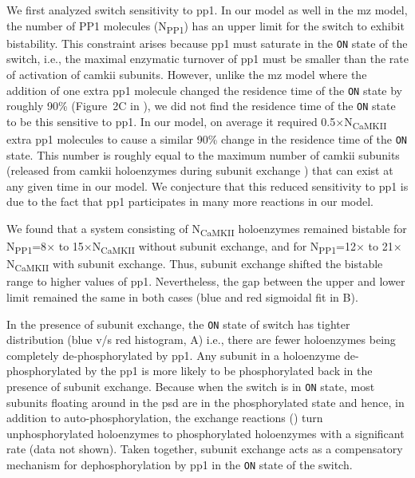 \documentclass[9pt,lineno,doublespacing]{elife}
\newcommand\SUB[2]{#1\textsubscript{#2}}
\begin{document}
We first analyzed switch sensitivity to \gls{pp1}. In our model as well in the
\gls{mz} model, the number of PP1 molecules (\SUB{N}{PP1}) has an upper limit
for the switch to exhibit bistability. This constraint arises because \gls{pp1}
must saturate in the \texttt{ON} state of the switch, i.e., the maximal
enzymatic turnover of \gls{pp1} must be smaller than the rate of activation of
\gls{camkii} subunits. However, unlike the \gls{mz} model where the addition of
one extra \gls{pp1} molecule changed the residence time of the \texttt{ON} state by
roughly 90\% (Figure~2C in \citep{miller_stability_2005}), we did not find the
residence time of the \texttt{ON} state to be this sensitive to \gls{pp1}. In our
model, on average it required 0.5$\times$\SUB{N}{CaMKII} extra \gls{pp1}
molecules to cause a similar 90\% change in the residence time of the \texttt{ON}
state.  This number is roughly equal to the maximum number of \gls{camkii}
subunits (released from \gls{camkii} holoenzymes during subunit exchange
) that can exist at any given time in our model. We conjecture
that this reduced sensitivity to \gls{pp1} is due to the fact that \gls{pp1}
participates in many more reactions in our model. 

We found that a system consisting of \SUB{N}{CaMKII} holoenzymes remained
bistable for \SUB{N}{PP1}=8$\times$ to 15$\times$\SUB{N}{CaMKII} without subunit
exchange, and for \SUB{N}{PP1}=12$\times$ to 21$\times$\SUB{N}{CaMKII} with
subunit exchange. Thus, subunit exchange shifted the bistable range to higher
values of \gls{pp1}. Nevertheless, the gap between the upper and lower limit remained
the same in both cases (blue and red sigmoidal fit in B).

In the presence of subunit exchange, the \texttt{ON} state of switch has tighter
distribution (blue v/s red histogram, A) i.e., there are
fewer holoenzymes being completely de-phosphorylated by \gls{pp1}. Any subunit
in a holoenzyme de-phosphorylated by the \gls{pp1} is more likely to be
phosphorylated back in the presence of subunit exchange. Because when the switch
is in \texttt{ON} state, most subunits floating around in the \gls{psd} are in
the phosphorylated state and hence, in addition to auto-phosphorylation, the
exchange reactions () turn unphosphorylated holoenzymes to
phosphorylated holoenzymes with a significant rate (data not shown). Taken
together, subunit exchange acts as a compensatory mechanism for
dephosphorylation by \gls{pp1} in the \texttt{ON} state of the switch.
\end{document}
